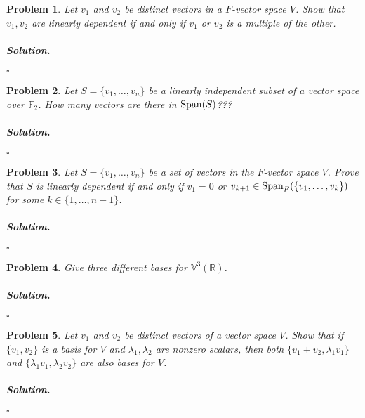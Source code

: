\documentclass[reqno]{amsart}
\theoremstyle{plain}
\newtheorem{problem}{Problem}
\theoremstyle{definition}
\newenvironment{solution}{\paragraph{\emph{Solution}.}}{\hfill$\square$}
\begin{document}
\begin{problem}
Let $v_{1}$ and $v_{2}$ be distinct vectors in a $F$-vector space $V$.  Show that $v_{1},v_{2}$ are linearly dependent if and only if $v_{1}$ or $v_{2}$ is a multiple of the other.
\end{problem}
\begin{solution}

\end{solution}

\begin{problem}
Let $S=\{v_{1},\ldots,v_{n} \}$ be a linearly independent subset of a vector space over $\mathbb{F}_{2}$.  How many vectors are there in ${\rm Span}(S)$???
\end{problem}
\begin{solution}

\end{solution}


\begin{problem}
Let $S = \{v_{1},\ldots,v_{n} \}$ be a set of vectors in the $F$-vector space $V$.  Prove that $S$ is linearly dependent if and only if $v_{1} = 0$ or $v_{k+1} \in {\rm Span}_{F}(\{v_{1},\ldots,v_{k} \})$ for some $k \in \{1,\ldots,n-1 \}$.
\end{problem}
\begin{solution}

\end{solution}

\begin{problem}
Give three different bases for $\mathbb{V}^{3}(\mathbb{R})$.
\end{problem}
\begin{solution}

\end{solution}

\begin{problem}
Let $v_{1}$ and $v_{2}$ be distinct vectors of a vector space $V$.  Show that if $\{v_{1},v_{2} \}$ is a basis for $V$ and $\lambda_{1},\lambda_{2}$ are nonzero scalars, then both $\{v_{1}+v_{2},\lambda_{1}v_{1} \}$ and $\{\lambda_{1}v_{1},\lambda_{2}v_{2} \}$ are also bases for $V$.
\end{problem}
\begin{solution}

\end{solution}
\end{document}

